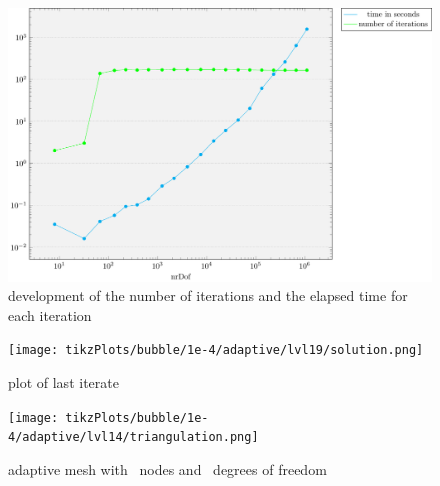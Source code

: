 \documentclass[draft=false,twoside,12pt]{scrreprt}
\begin{document}
\begin{figure}[H]
	\centering
	\includegraphics[width=16cm]{tikzPlots/bubble/misc.pdf}
  \caption{development of the number of iterations and the elapsed time for 
  each iteration}
\end{figure}

\begin{figure}[H]
  \centering
	\texttt{[image: tikzPlots/bubble/1e-4/adaptive/lvl19/solution.png]}
  \caption{plot of last iterate}
\end{figure}


\begin{figure}[H]
	\centering
  \texttt{[image: tikzPlots/bubble/1e-4/adaptive/lvl14/triangulation.png]}
  \caption{adaptive mesh with \nrNodes\ nodes and 
  \nrDof\ degrees of freedom}
\end{figure}

\end{document}
